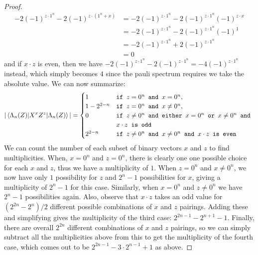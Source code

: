 \documentclass[12pt]{dalthesis}
\begin{document}
\begin{proof}
\begin{equation*}
\begin{split}
-2(-1)^{z \cdot 1^n} - 2(-1)^{z \cdot (1^n + x)} & = -2(-1)^{z \cdot 1^n} - 2(-1)^{z \cdot 1^n} (-1)^{z \cdot x} \\
& = -2(-1)^{z \cdot 1^n} - 2(-1)^{z \cdot 1^n} (-1)^1 \\
& = -2(-1)^{z \cdot 1^n} + 2(-1)^{z \cdot 1^n} \\
& = 0
\end{split}
\end{equation*}
and if $x \cdot z$ is even, then we have $-2(-1)^{z \cdot 1^n} - 2(-1)^{z \cdot 1^n} = -4(-1)^{z \cdot 1^n}$ instead, which simply becomes $4$ since the pauli spectrum requires we take the absolute value. We can now summarize:
\begin{equation*}
|\braket{\Lambda_n (Z)|X^xZ^z|\Lambda_n (Z)}| = \begin{cases}
1 & \texttt{if } z = 0^n \texttt{ and } x = 0^n, \\
1 - 2^{2-n} & \texttt{if } z = 0^n \texttt{ and } x \neq 0^n, \\
0 & \texttt{if } z \neq 0^n \texttt{ and either } x = 0^n \texttt{ or } x \neq 0^n \texttt{ and } \\
& x \cdot z \texttt{ is odd} \\
2^{2-n} & \texttt{if } z \neq 0^n \texttt{ and } x \neq 0^n
 \texttt{ and } x \cdot z \texttt{ is even}
\end{cases}
\end{equation*}
We can count the number of each subset of binary vectors $x$ and $z$ to find multiplicities. When, $x=0^n$ and $z = 0^n$, there is clearly one one possible choice for each $x$ and $z$, thus we have a multiplicity of $1$. When $z = 0^n$ and $x \neq 0^n$, we now have only $1$ possibility for $z$ and $2^n - 1$ possibilities for $x$, giving a multiplicity of $2^n - 1$ for this case. Similarly, when $x = 0^n$ and $z \neq 0^n$ we have $2^n - 1$ possibilities again. Also, observe that $x \cdot z$ takes an odd value for $(2^{2n}-2^{n})/2$ different possible combinations of $x$ and $z$ pairings. Adding these and simplifying gives the multiplicity of the third case: $2^{2n-1} - 2^{n+1} - 1$. Finally, there are overall $2^{2n}$ different combinations of $x$ and $z$ pairings, so we can simply subtract all the multiplicities above from this to get the multiplicity of the fourth case, which comes out to be $2^{2n-1} - 3 \cdot 2^{n-1} + 1$ as above.
\end{proof}
\end{document}
